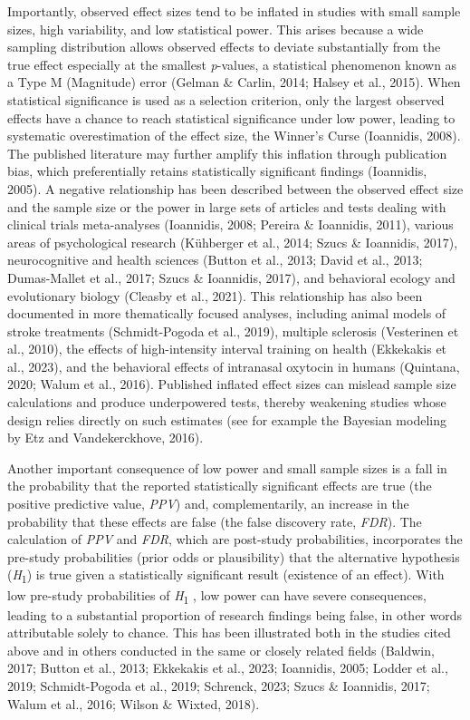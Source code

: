 \documentclass[authordate, meta, issue]{jote-new-article}
\begin{document}
	Importantly, observed effect sizes tend to be inflated in studies with small sample sizes, high variability, and low statistical power. This arises because a wide sampling distribution allows observed effects to deviate substantially from the true effect especially at the smallest \emph{p}-values, a statistical phenomenon known as a Type M (Magnitude) error (Gelman \& Carlin, 2014; Halsey et al., 2015). When statistical significance is used as a selection criterion, only the largest observed effects have a chance to reach statistical significance under low power, leading to systematic overestimation of the effect size, the Winner's Curse (Ioannidis, 2008). The published literature may further amplify this inflation through publication bias, which preferentially retains statistically significant findings (Ioannidis, 2005). A negative relationship has been described between the observed effect size and the sample size or the power in large sets of articles and tests dealing with clinical trials meta-analyses (Ioannidis, 2008; Pereira \& Ioannidis, 2011), various areas of psychological research (Kühberger et al., 2014; Szucs \& Ioannidis, 2017), neurocognitive and health sciences (Button et al., 2013; David et al., 2013; Dumas-Mallet et al., 2017; Szucs \& Ioannidis, 2017), and behavioral ecology and evolutionary biology (Cleasby et al., 2021). This relationship has also been documented in more thematically focused analyses, including animal models of stroke treatments (Schmidt-Pogoda et al., 2019), multiple sclerosis (Vesterinen et al., 2010), the effects of high-intensity interval training on health (Ekkekakis et al., 2023), and the behavioral effects of intranasal oxytocin in humans (Quintana, 2020; Walum et al., 2016). Published inflated effect sizes can mislead sample size calculations and produce underpowered tests, thereby weakening studies whose design relies directly on such estimates (see for example the Bayesian modeling by Etz and Vandekerckhove, 2016).



	Another important consequence of low power and small sample sizes is a fall in the probability that the reported statistically significant effects are true (the positive predictive value, \emph{PPV}) and, complementarily, an increase in the probability that these effects are false (the false discovery rate, \emph{FDR}). The calculation of \emph{PPV} and \emph{FDR}, which are post-study probabilities, incorporates the pre-study probabilities (prior odds or plausibility) that the alternative hypothesis (\emph{H}\textsubscript{1}) is true given a statistically significant result (existence of an effect). With low pre-study probabilities of \emph{H}\textsubscript{1} , low power can have severe consequences, leading to a substantial proportion of research findings being false, in other words attributable solely to chance. This has been illustrated both in the studies cited above and in others conducted in the same or closely related fields (Baldwin, 2017; Button et al., 2013; Ekkekakis et al., 2023; Ioannidis, 2005; Lodder et al., 2019; Schmidt-Pogoda et al., 2019; Schrenck, 2023; Szucs \& Ioannidis, 2017; Walum et al., 2016; Wilson \& Wixted, 2018).
\end{document}
